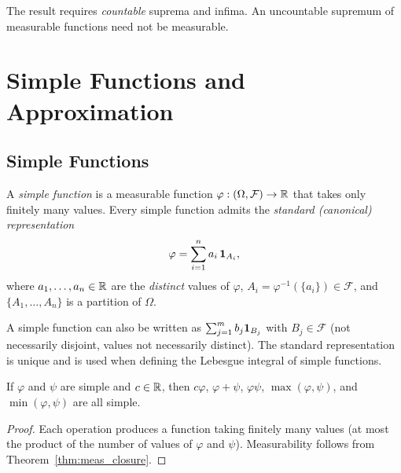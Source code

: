 \documentclass[11pt,a4paper]{article}
\begin{document}
\begin{remark}
The result requires \emph{countable} suprema and infima. An uncountable
supremum of measurable functions need not be measurable.
\end{remark}


\section{Simple Functions and Approximation}
\label{sec:simple}

\subsection{Simple Functions}
\label{subsec:simple_def}

\begin{definition}
\label{def:simple}
A \emph{simple function} is a measurable function
$\varphi: (\Omega, \mathcal{F}) \to \mathbb{R}$ that takes only finitely many
values. Every simple function admits the \emph{standard (canonical)
representation}
\begin{equation}
  \varphi = \sum_{i=1}^{n} a_i \, \mathbf{1}_{A_i},
  \label{eq:simple_standard}
\end{equation}
where $a_1, \ldots, a_n \in \mathbb{R}$ are the \emph{distinct} values of
$\varphi$, $A_i = \varphi^{-1}(\{a_i\}) \in \mathcal{F}$, and
$\{A_1, \ldots, A_n\}$ is a partition of $\Omega$.
\end{definition}

\begin{remark}
A simple function can also be written as $\sum_{j=1}^m b_j \mathbf{1}_{B_j}$
with $B_j \in \mathcal{F}$ (not necessarily disjoint, values not necessarily
distinct). The standard representation is unique and is used when defining
the Lebesgue integral of simple functions.
\end{remark}

\begin{proposition}
\label{prop:simple_algebra}
If $\varphi$ and $\psi$ are simple and $c \in \mathbb{R}$, then $c\varphi$,
$\varphi + \psi$, $\varphi\psi$, $\max(\varphi,\psi)$,
and $\min(\varphi,\psi)$ are all simple.
\end{proposition}

\begin{proof}
Each operation produces a function taking finitely many values (at most the
product of the number of values of $\varphi$ and $\psi$). Measurability
follows from Theorem~\ref{thm:meas_closure}.
\end{proof}
\end{document}
